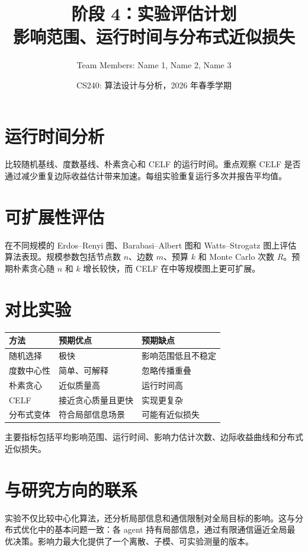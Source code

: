 \documentclass[UTF8, 11pt]{ctexart}
\title{\textbf{阶段 4：实验评估计划}\\
影响范围、运行时间与分布式近似损失}
\author{Team Members: Name 1, Name 2, Name 3}
\date{CS240: 算法设计与分析，2026 年春季学期}
\begin{document}
\maketitle

\section{运行时间分析}

比较随机基线、度数基线、朴素贪心和 CELF 的运行时间。重点观察 CELF 是否通过减少重复边际收益估计带来加速。每组实验重复运行多次并报告平均值。

\section{可扩展性评估}

在不同规模的 Erdos--Renyi 图、Barabasi--Albert 图和 Watts--Strogatz 图上评估算法表现。规模参数包括节点数 $n$、边数 $m$、预算 $k$ 和 Monte Carlo 次数 $R$。预期朴素贪心随 $n$ 和 $k$ 增长较快，而 CELF 在中等规模图上更可扩展。

\section{对比实验}

\begin{center}
\begin{tabular}{lll}
\toprule
方法 & 预期优点 & 预期缺点 \\
\midrule
随机选择 & 极快 & 影响范围低且不稳定 \\
度数中心性 & 简单、可解释 & 忽略传播重叠 \\
朴素贪心 & 近似质量高 & 运行时间高 \\
CELF & 接近贪心质量且更快 & 实现更复杂 \\
分布式变体 & 符合局部信息场景 & 可能有近似损失 \\
\bottomrule
\end{tabular}
\end{center}

主要指标包括平均影响范围、运行时间、影响力估计次数、边际收益曲线和分布式近似损失。

\section{与研究方向的联系}

实验不仅比较中心化算法，还分析局部信息和通信限制对全局目标的影响。这与分布式优化中的基本问题一致：各 agent 持有局部信息，通过有限通信逼近全局最优决策。影响力最大化提供了一个离散、子模、可实验测量的版本。
\end{document}
